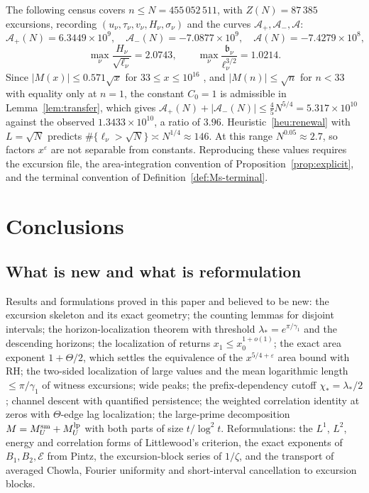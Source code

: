\documentclass[11pt]{amsart}
\numberwithin{equation}{section}
\theoremstyle{plain}
\theoremstyle{definition}
\theoremstyle{remark}
\newcommand{\Ap}{\mathcal{A}_{+}}
\newcommand{\Am}{\mathcal{A}_{-}}
\newcommand{\Anet}{\mathcal{A}}
\newcommand{\eps}{\varepsilon}
\newcommand{\En}{\mathcal{E}}
\begin{document}
The following census covers $n\le N=455\,052\,511$, with $Z(N)=87\,385$
excursions, recording $(u_\nu,\tau_\nu,v_\nu,H_\nu,\sigma_\nu)$ and the
curves $\Ap,\Am,\Anet$:
\begin{equation}
\label{eq:census_values}
  \Ap(N)=6.3449\times10^9,\quad \Am(N)=-7.0877\times10^9,\quad
  \Anet(N)=-7.4279\times10^8,
\end{equation}
\begin{equation}
\label{eq:census_max}
  \max_\nu\frac{H_\nu}{\sqrt{\ell_\nu}}=2.0743,\qquad
  \max_\nu\frac{\mathfrak b_\nu}{\ell_\nu^{3/2}}=1.0214 .
\end{equation}
Since $|M(x)|\le0.571\sqrt x$ for $33\le x\le10^{16}$ \cite{Hurst18}, and
$|M(n)|\le\sqrt n$ for $n<33$ with equality only at $n=1$, the
constant $C_0=1$ is admissible in Lemma~\ref{lem:transfer}, which gives
$\Ap(N)+|\Am(N)|\le\frac45N^{5/4}=5.317\times10^{10}$ against the observed
$1.3433\times10^{10}$, a ratio of $3.96$. Heuristic~\ref{heu:renewal} with
$L=\sqrt N$ predicts $\#\{\ell_\nu>\sqrt N\}\asymp N^{1/4}\approx146$. At
this range $N^{0.05}\approx2.7$, so factors $x^\eps$ are not separable from
constants. Reproducing these values requires the excursion file, the
area-integration convention of Proposition~\ref{prop:explicit}, and the
terminal convention of Definition~\ref{def:Ms-terminal}.

\section{Conclusions}
\label{sec:conclusions}

\subsection*{What is new and what is reformulation}
Results and formulations proved in this paper and believed to be new: the excursion skeleton and its exact geometry; the counting lemmas for
disjoint intervals; the horizon-localization theorem with threshold
$\lambda_*=e^{\pi/\gamma_1}$ and the descending horizons; the localization
of returns $x_1\le x_0^{1+o(1)}$; the exact area exponent $1+\Theta/2$, which
settles the equivalence of the $x^{5/4+\eps}$ area bound with RH; the
two-sided localization of large values and the mean logarithmic length
$\le\pi/\gamma_1$ of witness excursions; wide peaks; the prefix-dependency
cutoff $\chi_*=\lambda_*/2$; channel descent with quantified persistence;
the weighted correlation identity at zeros with $\Theta$-edge lag
localization; the large-prime decomposition $M=M^{\rm sm}_U+M^{\rm lp}_U$
with both parts of size $t/\log^2t$. Reformulations: the $L^1$, $L^2$,
energy and correlation forms of Littlewood's criterion, the exact exponents
of $B_1,B_2,\En$ from Pintz, the excursion-block series of $1/\zeta$, and the
transport of averaged Chowla, Fourier uniformity and short-interval
cancellation to excursion blocks.
\end{document}
